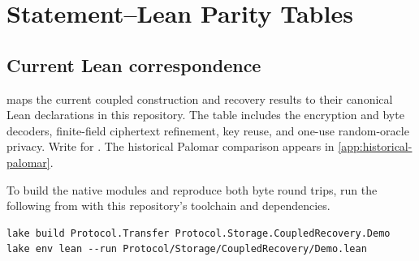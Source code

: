 \appendix

\section{Statement--Lean Parity Tables}\label{app:selected-crosswalk}\label{app:formal-boundaries}

\subsection{Current Lean correspondence}

 maps the current coupled construction and recovery
results to their canonical Lean declarations in this repository. The table
includes the encryption and byte decoders, finite-field ciphertext
refinement, key reuse, and one-use random-oracle privacy. Write 
for . The historical Palomar comparison
appears in \cref{app:historical-palomar}.

To build the native modules and reproduce both byte round trips, run the
following from  with this repository's toolchain and dependencies.
\begin{verbatim}
lake build Protocol.Transfer Protocol.Storage.CoupledRecovery.Demo
lake env lean --run Protocol/Storage/CoupledRecovery/Demo.lean
\end{verbatim}

